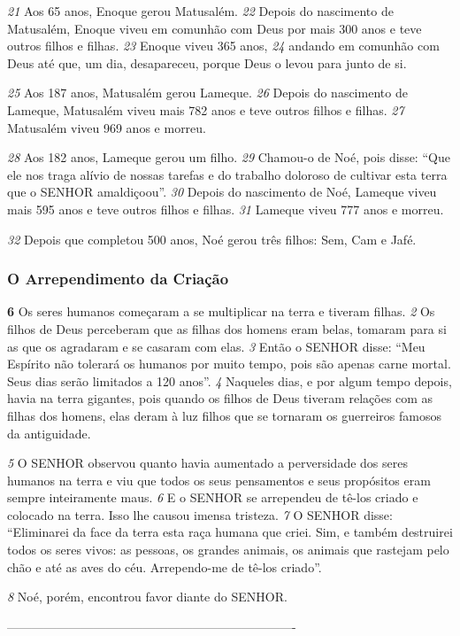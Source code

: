 \bigskip
\textit{\tiny 21}
Aos 65 anos, Enoque gerou Matusalém.  
\textit{\tiny 22}
Depois do nascimento de Matusalém,
 Enoque viveu em comunhão com Deus por mais 300 anos e teve outros filhos e
 filhas.  
\textit{\tiny 23}
Enoque viveu 365 anos,  
\textit{\tiny 24}
andando em comunhão com Deus até que,
 um dia, desapareceu, porque Deus o levou para junto de si.

\bigskip
\textit{\tiny 25}
Aos 187 anos, Matusalém gerou Lameque.  
\textit{\tiny 26}
Depois do nascimento de
 Lameque, Matusalém viveu mais 782 anos e teve outros filhos e filhas.
\textit{\tiny 27}
Matusalém viveu 969 anos e morreu.

\bigskip
\textit{\tiny 28}
Aos 182 anos, Lameque gerou um filho.  
\textit{\tiny 29}
Chamou-o de Noé, pois disse: “Que
 ele nos traga alívio de nossas tarefas e do trabalho doloroso de cultivar esta terra
 que o SENHOR amaldiçoou”.  
\textit{\tiny 30}
Depois do nascimento de Noé, Lameque viveu mais
 595 anos e teve outros filhos e filhas.  
\textit{\tiny 31}
Lameque viveu 777 anos e morreu.

\bigskip
\textit{\tiny 32}
Depois que completou 500 anos, Noé gerou três filhos: Sem, Cam e Jafé.

\bigskip
\subsubsection*{O Arrependimento da Criação}
\textbf{\large 6} 
Os seres humanos começaram a se multiplicar na terra e tiveram filhas. 
\textit{\tiny 2}
Os filhos de Deus perceberam que as filhas dos homens eram belas, tomaram para si
as que os agradaram e se casaram com elas. 
\textit{\tiny 3}
Então o SENHOR disse: “Meu Espírito
não tolerará os humanos por muito tempo, pois são apenas carne mortal. Seus
dias serão limitados a 120 anos”.
\textit{\tiny 4}
Naqueles dias, e por algum tempo depois, havia na terra gigantes, pois
quando os filhos de Deus tiveram relações com as filhas dos homens, elas deram à
luz filhos que se tornaram os guerreiros famosos da antiguidade.

\bigskip
\textit{\tiny 5}
O SENHOR observou quanto havia aumentado a perversidade dos seres
humanos na terra e viu que todos os seus pensamentos e seus propósitos eram
sempre inteiramente maus. 
\textit{\tiny 6}
E o SENHOR se arrependeu de tê-los criado e colocado
na terra. Isso lhe causou imensa tristeza. 
\textit{\tiny 7}
O SENHOR disse: “Eliminarei da face da
terra esta raça humana que criei. Sim, e também destruirei todos os seres vivos: as
pessoas, os grandes animais, os animais que rastejam pelo chão e até as aves do
céu. Arrependo-me de tê-los criado”. 

\bigskip
\textit{\tiny 8}
Noé, porém, encontrou favor diante do
SENHOR.

----------------------------------------------------------------------
